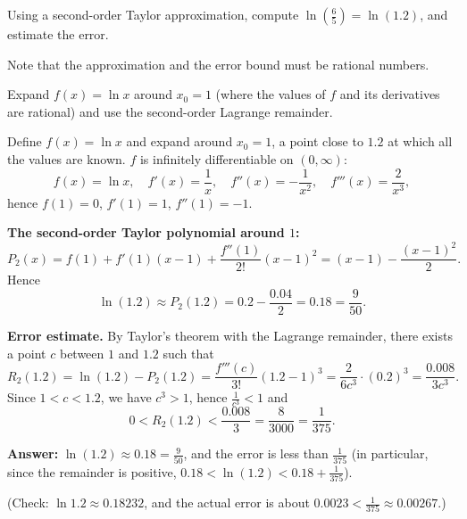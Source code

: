 
\begin{question}
Using a second-order Taylor approximation, compute $\ln\left(\frac{6}{5}\right) = \ln(1.2)$, and estimate the error.

Note that the approximation and the error bound must be rational numbers.
\end{question}

\begin{hint}
Expand $f(x) = \ln x$ around $x_0 = 1$ (where the values of $f$ and its derivatives are rational) and use the second-order Lagrange remainder.
\end{hint}

\begin{solution}
Define $f(x) = \ln x$ and expand around $x_0 = 1$, a point close to $1.2$ at which all the values are known. $f$ is infinitely differentiable on $(0,\infty)$:
\[ f(x) = \ln x,\quad f'(x) = \frac{1}{x},\quad f''(x) = -\frac{1}{x^2},\quad f'''(x) = \frac{2}{x^3}, \]
hence $f(1) = 0$, $f'(1) = 1$, $f''(1) = -1$.

\textbf{The second-order Taylor polynomial around $1$:}
\[ P_2(x) = f(1) + f'(1)(x - 1) + \frac{f''(1)}{2!}(x - 1)^2 = (x - 1) - \frac{(x - 1)^2}{2}. \]
Hence
\[ \ln(1.2) \approx P_2(1.2) = 0.2 - \frac{0.04}{2} = 0.18 = \frac{9}{50}. \]

\textbf{Error estimate.} By Taylor's theorem with the Lagrange remainder, there exists a point $c$ between $1$ and $1.2$ such that
\[ R_2(1.2) = \ln(1.2) - P_2(1.2) = \frac{f'''(c)}{3!}(1.2 - 1)^3 = \frac{2}{6c^3}\cdot (0.2)^3 = \frac{0.008}{3c^3}. \]
Since $1 < c < 1.2$, we have $c^3 > 1$, hence $\frac{1}{c^3} < 1$ and
\[ 0 < R_2(1.2) < \frac{0.008}{3} = \frac{8}{3000} = \frac{1}{375}. \]

\textbf{Answer:} $\ln(1.2) \approx 0.18 = \frac{9}{50}$, and the error is less than $\frac{1}{375}$ (in particular, since the remainder is positive, $0.18 < \ln(1.2) < 0.18 + \frac{1}{375}$).

(Check: $\ln 1.2 \approx 0.18232$, and the actual error is about $0.0023 < \frac{1}{375} \approx 0.00267$.)
\end{solution}
